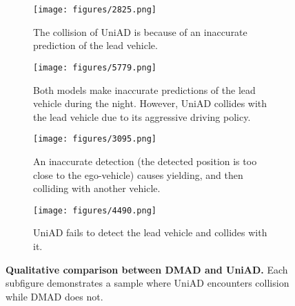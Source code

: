 \begin{figure*}[t]
  \centering
  \begin{subfigure}{1\linewidth}
    \centering
    \texttt{[image: figures/2825.png]}
    \caption{The collision of UniAD is because of an inaccurate prediction of the lead vehicle.}
    \label{fig:compare1}
  \end{subfigure}
  \begin{subfigure}{1\linewidth}
    \centering
    \texttt{[image: figures/5779.png]}
    \caption{Both models make inaccurate predictions of the lead vehicle during the night. However, UniAD collides with the lead vehicle due to its aggressive driving policy.}
    \label{fig:compare2}
  \end{subfigure}
  \begin{subfigure}{1\linewidth}
    \centering
    \texttt{[image: figures/3095.png]}
    \caption{An inaccurate detection (the detected position is too close to the ego-vehicle) causes yielding, and then colliding with another vehicle.}
    \label{fig:compare3}
  \end{subfigure}
  \begin{subfigure}{1\linewidth}
    \centering
    \texttt{[image: figures/4490.png]}
    \caption{UniAD fails to detect the lead vehicle and collides with it.}
    \label{fig:compare4}
  \end{subfigure}
  \caption{\textbf{Qualitative comparison between DMAD and UniAD.} Each subfigure demonstrates a sample where UniAD encounters collision while DMAD does not.}
  \label{fig:compare}
\end{figure*}

